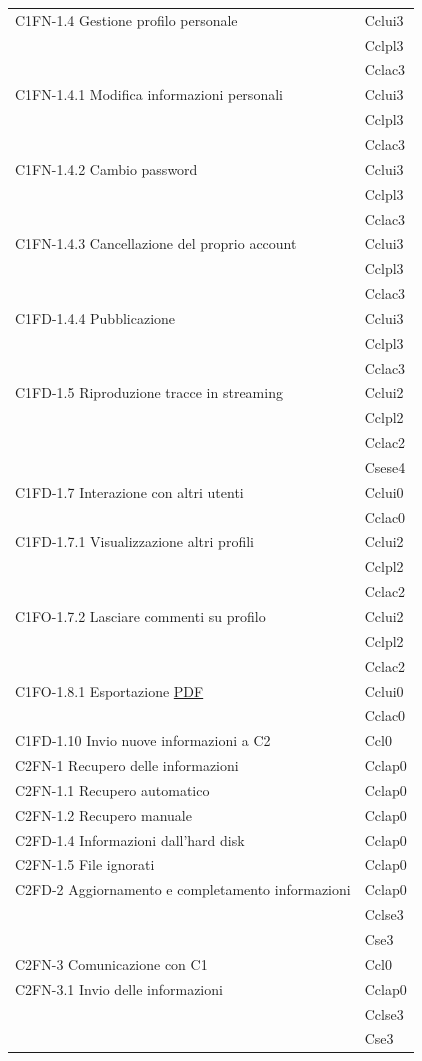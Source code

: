 \begin{footnotesize}
\begin{longtable}[!h]{|l|l|}
C1FN-1.4 Gestione profilo personale & Cclui3\\
 & Cclpl3\\
 & Cclac3\\\hline 
C1FN-1.4.1 Modifica informazioni personali & Cclui3\\
 & Cclpl3\\
 & Cclac3\\\hline 
C1FN-1.4.2 Cambio password & Cclui3\\
 & Cclpl3\\
 & Cclac3\\\hline 
C1FN-1.4.3 Cancellazione del proprio account & Cclui3\\
 & Cclpl3\\
 & Cclac3\\\hline 
C1FD-1.4.4 Pubblicazione & Cclui3\\
 & Cclpl3\\
 & Cclac3\\\hline 
C1FD-1.5 Riproduzione tracce in streaming & Cclui2\\
 & Cclpl2\\
 & Cclac2\\
 & Csese4\\\hline 
C1FD-1.7 Interazione con altri utenti & Cclui0\\
 & Cclac0\\\hline 
C1FD-1.7.1 Visualizzazione altri profili & Cclui2\\
 & Cclpl2\\
 & Cclac2\\\hline
C1FO-1.7.2 Lasciare commenti su profilo & Cclui2\\
 & Cclpl2\\
 & Cclac2\\\hline
C1FO-1.8.1 Esportazione \underline{PDF} & Cclui0\\
 & Cclac0\\\hline
C1FD-1.10 Invio nuove informazioni a C2 & Ccl0\\\hline
C2FN-1 Recupero delle informazioni & Cclap0\\\hline
C2FN-1.1 Recupero automatico & Cclap0\\\hline
C2FN-1.2 Recupero manuale & Cclap0\\\hline
C2FD-1.4 Informazioni dall'hard disk & Cclap0\\\hline
C2FN-1.5 File ignorati & Cclap0\\\hline
C2FD-2 Aggiornamento e completamento informazioni & Cclap0\\
 & Cclse3\\
 & Cse3\\\hline 
C2FN-3 Comunicazione con C1 & Ccl0\\ \hline 
C2FN-3.1 Invio delle informazioni & Cclap0\\
 & Cclse3\\
 & Cse3\\\hline 


\end{longtable}
\end{footnotesize}
